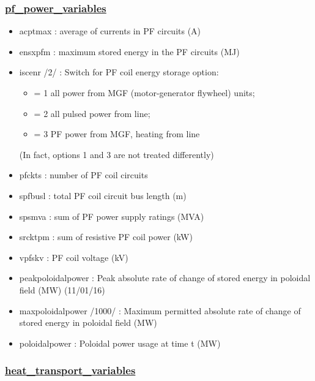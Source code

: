 \documentclass[]{article}
\providecommand{\tightlist}{%
  \setlength{\itemsep}{0pt}\setlength{\parskip}{0pt}}
\begin{document}
\subsubsection{\texorpdfstring{\href{pf_power_variables.html}{pf\_power\_variables}}{pf\_power\_variables}}\label{pf_power_variables}

\begin{itemize}
\tightlist
\item
  acptmax : average of currents in PF circuits (A)
\item
  ensxpfm : maximum stored energy in the PF circuits (MJ)
\item
  iscenr /2/ : Switch for PF coil energy storage option:

  \begin{itemize}
  \tightlist
  \item
    = 1 all power from MGF (motor-generator flywheel) units;
  \item
    = 2 all pulsed power from line;
  \item
    = 3 PF power from MGF, heating from line
  \end{itemize}

  (In fact, options 1 and 3 are not treated differently)
\item
  pfckts : number of PF coil circuits
\item
  spfbusl : total PF coil circuit bus length (m)
\item
  spsmva : sum of PF power supply ratings (MVA)
\item
  srcktpm : sum of resistive PF coil power (kW)
\item
  vpfskv : PF coil voltage (kV)
\item
  peakpoloidalpower : Peak absolute rate of change of stored energy in
  poloidal field (MW) (11/01/16)
\item
  maxpoloidalpower /1000/ : Maximum permitted absolute rate of change of
  stored energy in poloidal field (MW)
\item
  poloidalpower : Poloidal power usage at time t (MW)
\end{itemize}

\subsubsection{\texorpdfstring{\href{heat_transport_variables.html}{heat\_transport\_variables}}{heat\_transport\_variables}}\label{heat_transport_variables}
\end{document}
